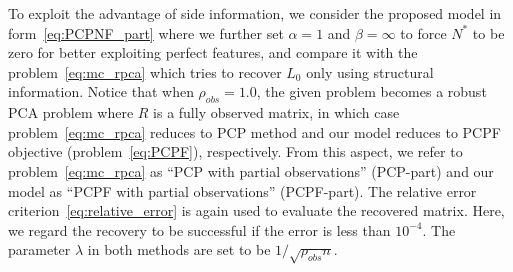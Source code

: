\documentclass[twoside,11pt]{article}
\def\realL{L_0}
\def\optN{N^*}
\begin{document}
To exploit the advantage of side information, we consider
the proposed model in form~\eqref{eq:PCPNF_part} where we further set $\alpha = 1$
and $\beta = \infty$ to force $\optN$ to be zero for better exploiting perfect features,
and compare it with the problem~\eqref{eq:mc_rpca} which
tries to recover $\realL$ only using structural information.
Notice that when $\rho_{obs} = 1.0$, the given problem becomes a robust PCA problem
where $R$ is a fully observed matrix, in which case
problem~\eqref{eq:mc_rpca} reduces to PCP method and our model
reduces to PCPF objective (problem~\ref{eq:PCPF}), respectively.
From this aspect, we refer to problem~\eqref{eq:mc_rpca} as ``PCP with partial observations'' (PCP-part)
and our model as ``PCPF with partial observations'' (PCPF-part).
The relative error criterion~\eqref{eq:relative_error} is again used to evaluate the
recovered matrix.  Here, we regard the recovery to be successful if the error
is less than $10^{-4}$.  The parameter $\lambda$ in both methods are set to be $1/\sqrt{\rho_{obs}n}$.
\end{document}
